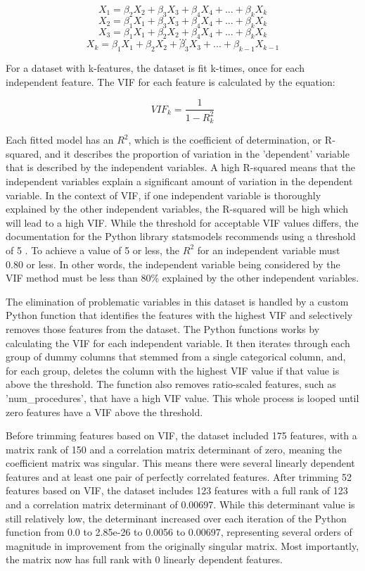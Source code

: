 \documentclass[sigconf]{acmart}
\begin{document}
\[X_1 = \beta_2X_2 + \beta_3X_3 + \beta_4X_4 + ... + \beta_kX_k \]
\[X_2 = \beta_1X_1 + \beta_3X_3 + \beta_4X_4 + ... + \beta_kX_k \]
\[X_3 = \beta_1X_1 + \beta_2X_2 + \beta_4X_4 + ... + \beta_kX_k \]
\[...\]
\[X_k = \beta_1X_1 + \beta_2X_2 + \beta_3X_3 + ... + \beta_{k-1}X_{k-1} \]

For a dataset with k-features, the dataset is fit k-times, once for each independent feature. The VIF for each feature is calculated by the equation:

\[ VIF_k =\frac{1}{1 - R^2_k}\]

Each fitted model has an \(R^2\), which is the coefficient of determination, or R-squared, and it describes the proportion of variation in the 'dependent' variable that is described by the independent variables. A high R-squared means that the independent variables explain a significant amount of variation in the dependent variable. In the context of VIF, if one independent variable is thoroughly explained by the other independent variables, the R-squared will be high which will lead to a high VIF. While the threshold for acceptable VIF values differs, the documentation for the Python library statsmodels recommends using a threshold of 5 \cite{cite15}. To achieve a value of 5 or less, the \(R^2\) for an independent variable must 0.80 or less. In other words, the independent variable being considered by the VIF method must be less than 80\% explained by the other independent variables.

The elimination of problematic variables in this dataset is handled by a custom Python function that identifies the features with the highest VIF and selectively removes those features from the dataset. The Python functions works by calculating the VIF for each independent variable. It then iterates through each group of dummy columns that stemmed from a single categorical column, and, for each group, deletes the column with the highest VIF value if that value is above the threshold. The function also removes ratio-scaled features, such as 'num\_procedures', that have a high VIF value. This whole process is looped until zero features have a VIF above the threshold.

Before trimming features based on VIF, the dataset included 175 features, with a matrix rank of 150 and a correlation matrix determinant of zero, meaning the coefficient matrix was singular. This means there were several linearly dependent features and at least one pair of perfectly correlated features. After trimming 52 features based on VIF, the dataset includes 123 features with a full rank of 123 and a correlation matrix determinant of 0.00697. While this determinant value is still relatively low, the determinant increased over each iteration of the Python function from 0.0 to 2.85e-26 to 0.0056 to 0.00697, representing several orders of magnitude in improvement from the originally singular matrix. Most importantly, the matrix now has full rank with 0 linearly dependent features.
\end{document}
